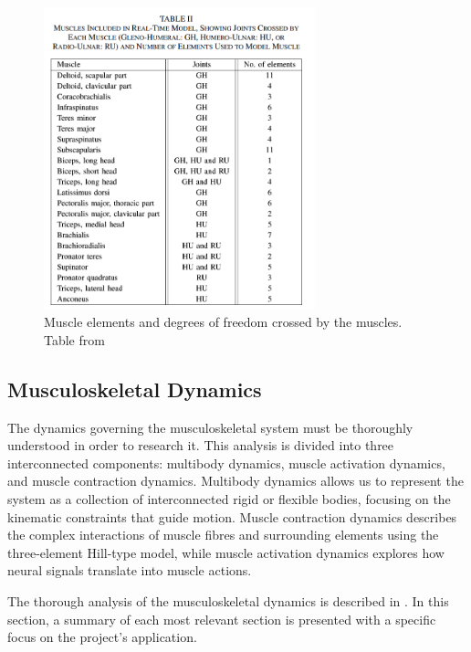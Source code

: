 \begin{figure}[ht!]
    \centering
    \includegraphics[width=0.7\textwidth]{Pictures/DAS/muscles_elements.png}
    \caption{Muscle elements and degrees of freedom crossed by the muscles. Table from \cite{RT3D}}
    \label{fig:muscle_elements}
\end{figure}

\newpage
\subsection{Musculoskeletal Dynamics}
The dynamics governing the musculoskeletal system must be thoroughly understood in order to research it. This analysis is divided into three interconnected components: multibody dynamics, muscle activation dynamics, and muscle contraction dynamics. Multibody dynamics allows us to represent the system as a collection of interconnected rigid or flexible bodies, focusing on the kinematic constraints that guide motion. Muscle contraction dynamics describes the complex interactions of muscle fibres and surrounding elements using the three-element Hill-type model, while muscle activation dynamics explores how neural signals translate into muscle actions.

The thorough analysis of the musculoskeletal dynamics is described in \cite{IMP}. In this section, a summary of each most relevant section is presented with a specific focus on the project's application.\newline


